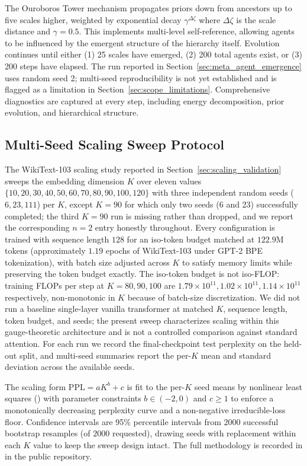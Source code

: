 \documentclass[11pt]{article}
\begin{document}
The Ouroboros Tower mechanism propagates priors down from ancestors up to five scales higher, weighted by exponential decay $\gamma^{\Delta\zeta}$ where $\Delta\zeta$ is the scale distance and $\gamma = 0.5$. This implements multi-level self-reference, allowing agents to be influenced by the emergent structure of the hierarchy itself. Evolution continues until either (1) 25 scales have emerged, (2) 200 total agents exist, or (3) 200 steps have elapsed. The run reported in Section~\ref{sec:meta_agent_emergence} uses random seed 2; multi-seed reproducibility is not yet established and is flagged as a limitation in Section~\ref{sec:scope_limitations}. Comprehensive diagnostics are captured at every step, including energy decomposition, prior evolution, and hierarchical structure.

\subsection{Multi-Seed Scaling Sweep Protocol}
\label{sec:methods_scaling}

The WikiText-103 scaling study reported in Section~\ref{sec:scaling_validation} sweeps the embedding dimension $K$ over eleven values $\{10, 20, 30, 40, 50, 60, 70, 80, 90, 100, 120\}$ with three independent random seeds ($6, 23, 111$) per $K$, except $K = 90$ for which only two seeds (6 and 23) successfully completed; the third $K = 90$ run is missing rather than dropped, and we report the corresponding $n = 2$ entry honestly throughout. Every configuration is trained with sequence length $128$ for an iso-token budget matched at $122.9$M tokens (approximately $1.19$ epochs of WikiText-103 under GPT-2 BPE tokenization), with batch size adjusted across $K$ to satisfy memory limits while preserving the token budget exactly. The iso-token budget is not iso-FLOP: training FLOPs per step at $K = 80, 90, 100$ are $1.79\times 10^{11}, 1.02\times 10^{11}, 1.14\times 10^{11}$ respectively, non-monotonic in $K$ because of batch-size discretization. We did not run a baseline single-layer vanilla transformer at matched $K$, sequence length, token budget, and seeds; the present sweep characterizes scaling within this gauge-theoretic architecture and is not a controlled comparison against standard attention. For each run we record the final-checkpoint test perplexity on the held-out split, and multi-seed summaries report the per-$K$ mean and standard deviation across the available seeds.

The scaling form $\mathrm{PPL} = aK^b + c$ is fit to the per-$K$ seed means by nonlinear least squares () with parameter constraints $b \in (-2, 0)$ and $c \geq 1$ to enforce a monotonically decreasing perplexity curve and a non-negative irreducible-loss floor. Confidence intervals are 95\% percentile intervals from $2000$ successful bootstrap resamples (of $2000$ requested), drawing seeds with replacement within each $K$ value to keep the sweep design intact. The full methodology is recorded in  in the public repository.
\end{document}
